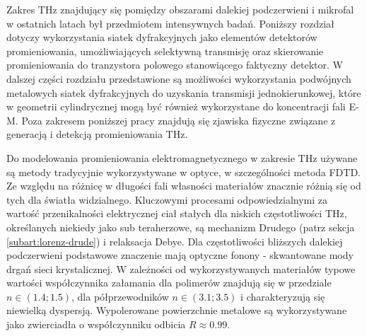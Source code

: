 Zakres THz znajdujący się pomiędzy obszarami dalekiej podczerwieni i mikrofal w ostatnich latach był przedmiotem intensywnych badań. Poniższy rozdział dotyczy wykorzystania siatek dyfrakcyjnych jako elementów detektorów promieniowania, umożliwiających selektywną transmisję oraz skierowanie promieniowania do tranzystora polowego stanowiącego faktyczny detektor. W dalszej części rozdziału przedstawione są możliwości wykorzystania podwójnych metalowych siatek dyfrakcyjnych do uzyskania transmisji jednokierunkowej, które w geometrii cylindrycznej mogą być również wykorzystane do koncentracji fali E-M. Poza zakresem poniższej pracy znajdują się zjawiska fizyczne związane z generacją i detekcją promieniowania THz.

Do modelowania promieniowania elektromagnetycznego w zakresie THz używane są metody tradycyjnie wykorzystywane w optyce, w  szczególności metoda FDTD. Ze względu na różnicę w długości fali własności materiałów znacznie różnią się od tych dla światła widzialnego. Kluczowymi procesami odpowiedzialnymi za wartość przenikalności elektrycznej ciał stałych dla niskich częstotliwości THz, określanych niekiedy jako sub teraherzowe, są mechanizm Drudego (patrz sekcja \ref{subart:lorenz-drude}) i relaksacja Debye. Dla częstotliwości bliższych dalekiej podczerwieni podstawowe znaczenie mają optyczne fonony - skwantowane mody drgań sieci krystalicznej. W zależności od wykorzystywanych materiałów typowe wartości współczynnika załamania dla polimerów znajdują się w przedziale $n \in (1.4;1.5)$, dla półprzewodników $n\in (3.1;3.5)$ i charakteryzują się niewielką dyspersją. Wypolerowane powierzchnie metalowe są wykorzystywane jako zwierciadła o współczynniku odbicia $R\approx 0.99$. \cite{lee2009principles}


